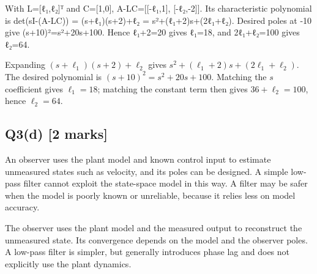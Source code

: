 \documentclass[11pt,a4paper]{article}
\begin{document}
With L=[ℓ₁,ℓ₂]ᵀ and C=[1,0], A-LC=[[-ℓ₁,1], [-ℓ₂,-2]].
Its characteristic polynomial is det(sI-(A-LC)) = (s+ℓ₁)(s+2)+ℓ₂ = s²+(ℓ₁+2)s+(2ℓ₁+ℓ₂).
Desired poles at -10 give (s+10)²=s²+20s+100.
Hence ℓ₁+2=20 gives ℓ₁=18, and 2ℓ₁+ℓ₂=100 gives ℓ₂=64.\par\smallskip Expanding $(s+\ell_1)(s+2)+\ell_2$ gives $s^2+(\ell_1+2)s+(2\ell_1+\ell_2)$. The desired polynomial is $(s+10)^2=s^2+20s+100$. Matching the $s$ coefficient gives $\ell_1=18$; matching the constant term then gives $36+\ell_2=100$, hence $\ell_2=64$.

\subsection*{Q3(d) \hfill [2 marks]}

An observer uses the plant model and known control input to estimate unmeasured states such as velocity, and its poles can be designed.
A simple low-pass filter cannot exploit the state-space model in this way.
A filter may be safer when the model is poorly known or unreliable, because it relies less on model accuracy.\par\smallskip The observer uses the plant model and the measured output to reconstruct the unmeasured state. Its convergence depends on the model and the observer poles. A low-pass filter is simpler, but generally introduces phase lag and does not explicitly use the plant dynamics.
\end{document}
